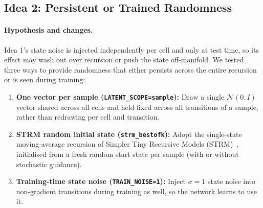 \documentclass[11pt]{article}
\begin{document}
\subsection{Idea 2: Persistent or Trained Randomness}
\label{sec:idea2}

\paragraph{Hypothesis and changes.}
Idea 1's state noise is injected independently per cell and only at test time, so its effect may wash out over recursion or push the state off-manifold. We tested three ways to provide randomness that either persists across the entire recursion or is seen during training:
\begin{enumerate}
  \item \textbf{One vector per sample (\texttt{LATENT\_SCOPE=sample}):} Draw a single $\mathcal{N}(0,I)$ vector shared across all cells and held fixed across all transitions of a sample, rather than redrawing per cell and transition.
  \item \textbf{STRM random initial state (\texttt{strm\_bestofk}):} Adopt the single-state moving-average recursion of Simpler Tiny Recursive Models (STRM)~\cite{glass2026}, initialised from a fresh random start state per sample (with or without stochastic guidance).
  \item \textbf{Training-time state noise (\texttt{TRAIN\_NOISE=1}):} Inject $\sigma=1$ state noise into non-gradient transitions during training as well, so the network learns to use it.
\end{enumerate}
\end{document}
